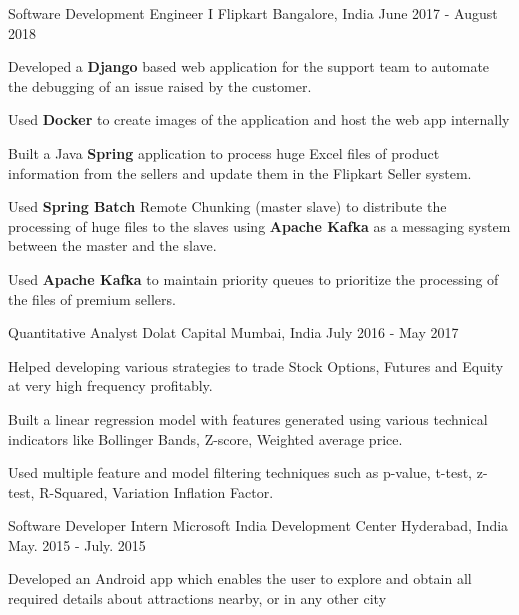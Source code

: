 \vspace{-0.8em}
\begin{cventries}
  \cventry
  {Software Development Engineer I} %
  {Flipkart} %
  {Bangalore, India} %
  {June 2017 - August 2018} %
  {
  \begin{cvitems} %
    \item {Developed a \textbf{Django} based web application for the support
    team to automate the debugging of an issue raised by the customer.}
    \item {Used \textbf{Docker} to create images of the application and host
    the web app internally}
    \item {Built a Java \textbf{Spring} application to process huge Excel
    files of product information from the sellers and update them in the
    Flipkart Seller system.}
    \item {Used \textbf{Spring Batch} Remote Chunking (master slave) to
    distribute the processing of huge files to the slaves using
    \textbf{Apache Kafka} as a messaging system between the master and the slave.}
    \item {Used \textbf{Apache Kafka} to maintain priority queues to
    prioritize the processing of the files of premium sellers.}
  \end{cvitems}
  }
  \cventry
  {Quantitative Analyst} %
  {Dolat Capital} %
  {Mumbai, India} %
  {July 2016 - May 2017} %
  {
  \begin{cvitems} %
    \item {Helped developing various strategies to trade Stock Options, Futures and Equity at very high frequency profitably.}
    \item {Built a linear regression model with features generated using various technical indicators like Bollinger Bands, Z-score, Weighted average price.}
    \item {Used multiple feature and model filtering techniques such as p-value, t-test, z-test, R-Squared, Variation Inflation Factor.}
  \end{cvitems}
  }
  \cventry
  {Software Developer Intern} %
  {Microsoft India Development Center} %
  {Hyderabad, India} %
  {May. 2015 - July. 2015} %
  {
  \begin{cvitems} %
    \item {Developed an Android app which enables the user to explore and obtain all required details about attractions nearby, or in any other city  }

\end{cvitems}}
\end{cventries}
